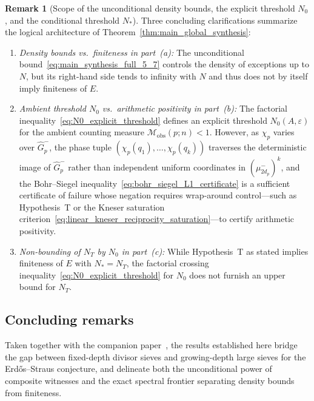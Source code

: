 \documentclass[11pt, a4paper]{article}
\theoremstyle{plain}
\theoremstyle{definition}
\newtheorem{remark}[theorem]{Remark}
\begin{document}
\begin{remark}[Scope of the unconditional density bounds, the explicit threshold $N_0$, and the conditional threshold $N_{\ast}$]\label{rem:global_synthesis_scope}
Three concluding clarifications summarize the logical architecture of Theorem~\ref{thm:main_global_synthesis}:
\begin{enumerate}[(1)]
    \item \emph{Density bounds vs.\ finiteness in part~(a):} The unconditional bound~\eqref{eq:main_synthesis_full_5_7} controls the density of exceptions up to $N$, but its right-hand side tends to infinity with $N$ and thus does not by itself imply finiteness of $E$.
    \item \emph{Ambient threshold $N_0$ vs.\ arithmetic positivity in part~(b):} The factorial inequality~\eqref{eq:N0_explicit_threshold} defines an explicit threshold $N_0(A,\varepsilon)$ for the ambient counting measure $\mathcal{M}_{\mathrm{obs}}(p;n)<1$. However, as $\chi_p$ varies over $\widehat{G}_p^{-}$, the phase tuple $(\chi_p(q_1),\dots,\chi_p(q_k))$ traverses the deterministic image of $\widehat{G}_p^{-}$ rather than independent uniform coordinates in $(\mu_{2d_p}^{-})^{k}$, and the Bohr--Siegel inequality~\eqref{eq:bohr_siegel_L1_certificate} is a sufficient certificate of failure whose negation requires wrap-around control---such as Hypothesis~T or the Kneser saturation criterion~\eqref{eq:linear_kneser_reciprocity_saturation}---to certify arithmetic positivity.
    \item \emph{Non-bounding of $N_T$ by $N_0$ in part~(c):} While Hypothesis~T as stated implies finiteness of $E$ with $N_{\ast}=N_T$, the factorial crossing inequality~\eqref{eq:N0_explicit_threshold} for $N_0$ does not furnish an upper bound for $N_T$.
\end{enumerate}
\end{remark}

\subsection{Concluding remarks}\label{sec:conclusion_paper2}

Taken together with the companion paper~\cite{dahan2026a}, the results established here bridge the gap between fixed-depth divisor sieves and growing-depth large sieves for the Erd\H{o}s--Straus conjecture, and delineate both the unconditional power of composite witnesses and the exact spectral frontier separating density bounds from finiteness.
\end{document}
